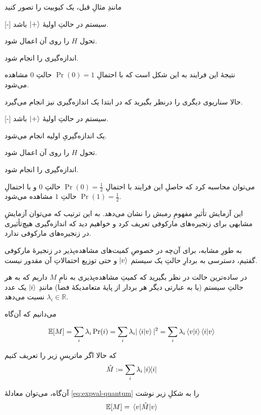 مانندِ مثالِ قبل، یک کیوبیت را تصور کنید 

[-]
 سیستم در حالتِ اولیهٔ 
\(\ket{+}\)
باشد.

 تحول \(H\) را روی آن اعمال شود.

 اندازه‌گیری را انجام شود.

نتیجهٔ این فرایند به این شکل است که با احتمالِ
\(\Pr(0) = 1\)
حالتِ \(0\) مشاهده می‌شود.

حالا سناریوی دیگری را درنظر بگیرید که در ابتدا یک اندازه‌گیری نیز انجام می‌گیرد.

[-]
 سیستم در حالتِ اولیهٔ 
\(\ket{+}\)
باشد.

 یک اندازه‌گیریِ اولیه انجام می‌شود.

 تحول \(H\) را روی آن اعمال شود.

 اندازه‌گیری را انجام شود.

می‌توان محاسبه کرد که حاصلِ این فرایند با احتمالِ
\(\Pr(0) = \frac{1}{2}\)
حالتِ \(0\) و با احتمالِ
\(\Pr(1) = \frac{1}{2}\)
حالتِ \(1\) مشاهده می‌شود.

این آزمایش تأثیرِ مفهومِ رمبش را نشان می‌دهد. به این ترتیب که می‌توان آزمایشِ مشابهی برای زنجیره‌های مارکوفی تعریف کرد و خواهیم دید که اندازه‌گیری هیچ‌تأثیری در زنجیره‌های مارکوفی ندارد.


به طورِ مشابه، برای آن‌چه در خصوصِ کمیت‌های مشاهده‌پذیر در زنجیرهٔ مارکوفی گفتیم، دسترسی به بردارِ حالتِ یک سیستم 
\(\ket{v}\)
و حتی توزیع احتمالاتِ آن مقدور نیست.

در ساده‌ترین حالت در نظر بگیرید که کمیتِ مشاهده‌پذیری به نامِ \(M\) داریم که به هر حالتِ سیستم (یا به عبارتی دیگر هر بردار از پایهٔ متعامد‌یکهٔ فضا) مانندِ 
\(\ket{i}\)
یک عدد 
\(\lambda_i \in \mathbb{R}\)
نسبت می‌دهد.

می‌دانیم که آن‌گاه

\begin{equation} \mathbb{E}[M] = \sum_i \lambda_i \Pr(i) = \sum_i \lambda_i |\braket{i}{v}|^2 = \sum_i \lambda_i \braket{v}{i}\braket{i}{v} 
\label{eq:expval-quantum} \end{equation}

که حالا اگر ماتریسِ زیر را تعریف کنیم
\begin{equation} \hat{M} := \sum_i \lambda_i \dyad{i} \end{equation}

آن‌گاه، می‌توان معادلهٔ 
\ref{eq:expval-quantum}
را به شکلِ زیر نوشت
\begin{equation} \mathbb{E}[M] = \ev{\hat{M}}{v} \end{equation}

